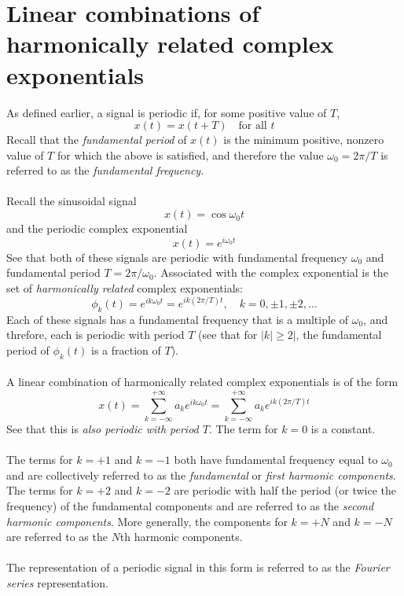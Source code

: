 \documentclass{report}
\begin{document}
\section{Linear combinations of harmonically related complex exponentials}
As defined earlier, a signal is periodic if, for some positive value of $T$,
\begin{equation*}
x(t)=x(t+T)\quad\text{for all }t
\end{equation*}
Recall that the \textit{fundamental period} of $x(t)$ is the minimum positive, nonzero value of $T$ for which the above is satisfied, and therefore the value $\omega_0=2\pi/T$ is referred to as the
\textit{fundamental frequency}.\\
\vspace{1mm}\\
Recall the sinusoidal signal
\begin{equation*}
x(t)=\cos\omega_0t
\end{equation*}
and the periodic complex exponential
\begin{equation*}
x(t)=e^{i\omega_0t}
\end{equation*}
See that both of these signals are periodic with fundamental frequency $\omega_0$ and fundamental period $T=2\pi/\omega_0$. Associated with the complex exponential is the set of 
\textit{harmonically related} complex exponentials:
\begin{equation*}
\phi_k(t)=e^{ik\omega_0t}=e^{ik(2\pi/T)t},\quad k=0,\pm1,\pm2,\ldots
\end{equation*}
Each of these signals has a fundamental frequency that is a multiple of $\omega_0$, and threfore, each is periodic with period $T$ (see that for $|k|\geq2|$, the fundamental
period of $\phi_k(t)$ is a fraction of $T$).\\
\vspace{1mm}\\
A linear combination of harmonically related complex exponentials is of the form
\begin{equation*}
x(t)=\sum^{+\infty}_{k=-\infty}a_ke^{ik\omega_0t}=\sum^{+\infty}_{k=-\infty}a_ke^{ik(2\pi/T)t}
\end{equation*}
See that this is \textit{also periodic with period $T$}. The term for $k=0$ is a constant.\\
\vspace{1mm}\\
The terms for $k=+1$ and $k=-1$ both have fundamental frequency equal to $\omega_0$ and are collectively referred to as the \textit{fundamental} or \textit{first harmonic components}. The terms for $k=+2$
and $k=-2$ are periodic with half the period (or twice the frequency) of the fundamental components and are referred to as the \textit{second harmonic components}. More generally,
the components for $k=+N$ and $k=-N$ are referred to as the $N$th harmonic components.\\
\vspace{1mm}\\
The representation of a periodic signal in this form is referred to as the \textit{Fourier series} representation.
\newpage
\end{document}

